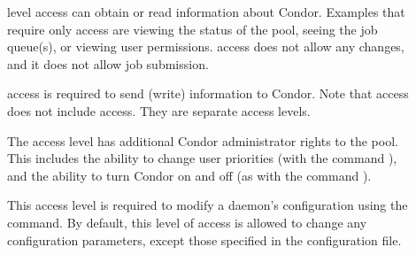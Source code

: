 \begin{description}

\item[] \label{dcperm:read}  level
   access can obtain or read information about Condor.
   Examples that require only  access are
   viewing the status of the pool, seeing the job queue(s),
   or viewing user permissions.
    access does not allow any
   changes, and it does not allow job submission.

\item[] \label{dcperm:write}  access
   is required to send (write) information to Condor.
   Note that  access does not include  access.
   They are separate access levels.

\item[] \label{dcperm:administrator} The
    access level has additional Condor
   administrator rights to the pool.  This includes the ability to
   change user priorities (with the command ),
   and the ability to turn Condor on and off
   (as with the command ).

\item[] \label{dcperm:config} This access level is
   required to modify a daemon's configuration using
   the  command.
   By default, this level of access is allowed
   to change any configuration parameters, except those specified in
   the  configuration file.

\item[] \label{dcperm:config} 

\end{description}

